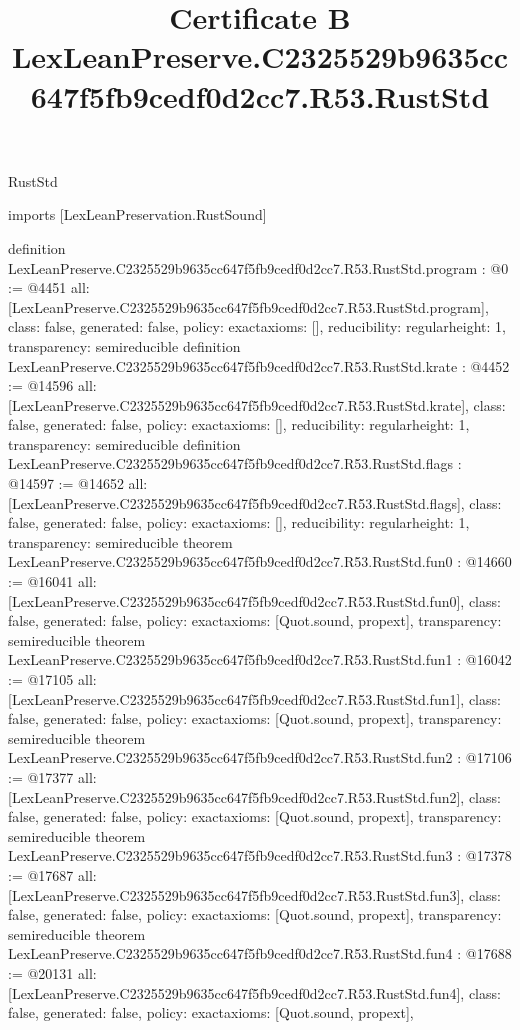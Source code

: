 \begin{lexlean}{RustStd}
\title{Certificate B LexLeanPreserve.C2325529b9635cc647f5fb9cedf0d2cc7.R53.RustStd}
\begin{coremodule}
imports [LexLeanPreservation.RustSound]

definition LexLeanPreserve.C2325529b9635cc647f5fb9cedf0d2cc7.R53.RustStd.program : @0 := @4451 {
  all: [LexLeanPreserve.C2325529b9635cc647f5fb9cedf0d2cc7.R53.RustStd.program],
  class: false,
  generated: false,
  policy: exact{axioms: []},
  reducibility: regular{height: 1},
  transparency: semireducible
}
definition LexLeanPreserve.C2325529b9635cc647f5fb9cedf0d2cc7.R53.RustStd.krate : @4452 := @14596 {
  all: [LexLeanPreserve.C2325529b9635cc647f5fb9cedf0d2cc7.R53.RustStd.krate],
  class: false,
  generated: false,
  policy: exact{axioms: []},
  reducibility: regular{height: 1},
  transparency: semireducible
}
definition LexLeanPreserve.C2325529b9635cc647f5fb9cedf0d2cc7.R53.RustStd.flags : @14597 := @14652 {
  all: [LexLeanPreserve.C2325529b9635cc647f5fb9cedf0d2cc7.R53.RustStd.flags],
  class: false,
  generated: false,
  policy: exact{axioms: []},
  reducibility: regular{height: 1},
  transparency: semireducible
}
theorem LexLeanPreserve.C2325529b9635cc647f5fb9cedf0d2cc7.R53.RustStd.fun0 : @14660 := @16041 {
  all: [LexLeanPreserve.C2325529b9635cc647f5fb9cedf0d2cc7.R53.RustStd.fun0],
  class: false,
  generated: false,
  policy: exact{axioms: [Quot.sound, propext]},
  transparency: semireducible
}
theorem LexLeanPreserve.C2325529b9635cc647f5fb9cedf0d2cc7.R53.RustStd.fun1 : @16042 := @17105 {
  all: [LexLeanPreserve.C2325529b9635cc647f5fb9cedf0d2cc7.R53.RustStd.fun1],
  class: false,
  generated: false,
  policy: exact{axioms: [Quot.sound, propext]},
  transparency: semireducible
}
theorem LexLeanPreserve.C2325529b9635cc647f5fb9cedf0d2cc7.R53.RustStd.fun2 : @17106 := @17377 {
  all: [LexLeanPreserve.C2325529b9635cc647f5fb9cedf0d2cc7.R53.RustStd.fun2],
  class: false,
  generated: false,
  policy: exact{axioms: [Quot.sound, propext]},
  transparency: semireducible
}
theorem LexLeanPreserve.C2325529b9635cc647f5fb9cedf0d2cc7.R53.RustStd.fun3 : @17378 := @17687 {
  all: [LexLeanPreserve.C2325529b9635cc647f5fb9cedf0d2cc7.R53.RustStd.fun3],
  class: false,
  generated: false,
  policy: exact{axioms: [Quot.sound, propext]},
  transparency: semireducible
}
theorem LexLeanPreserve.C2325529b9635cc647f5fb9cedf0d2cc7.R53.RustStd.fun4 : @17688 := @20131 {
  all: [LexLeanPreserve.C2325529b9635cc647f5fb9cedf0d2cc7.R53.RustStd.fun4],
  class: false,
  generated: false,
  policy: exact{axioms: [Quot.sound, propext]},
}
\end{coremodule}
\end{lexlean}
